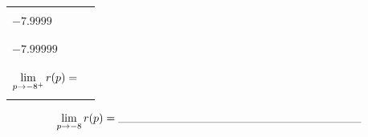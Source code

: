 \documentclass[notes]{subfiles}
\begin{document}
\begin{ex}
\begin{center}
\begin{minipage}{.45\textwidth}
\begin{tabu}{|X[c]|X[1.5,c]|}
								& \\ 
						$-7.9999$	& \\ 
								& \\ \hline
								& \\
						$-7.99999$	&\\
								&\\ \hline\hline
								&\\
						$\displaystyle \lim_{p\to -8^+}r(p) =$ & \\
								&\\ \hline
					\end{tabu}
				\end{minipage}
				\[\lim_{p\to -8}r(p)= \blank{3}\]
			\end{center}					
		\end{ex}
			\newpage
			
\end{document}
